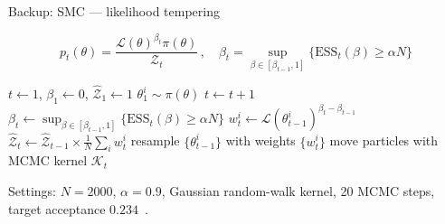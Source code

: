 \documentclass[usenames,dvipsnames,t]{beamer}
\begin{document}


\begin{frame}{Backup: SMC --- likelihood tempering}
  \def\x{1mm}


  \small
  \begin{equation*}
    p_t(\theta) = \frac{\mathcal{L}(\theta)^{\beta_t}\pi(\theta)}{\mathcal{Z}_t} \, , \quad \beta_t = \sup_{\beta \in [\beta_{t-1},1]}\{\mathrm{ESS}_t(\beta) \geq \alpha N\}
  \end{equation*}
  \normalsize

  \vspace{3mm}

  \scriptsize
  \begin{algorithmic}[1]
    \State $t \gets 1$, $\beta_1 \gets 0$, $\hat{\mathcal{Z}}_1 \gets 1$
      \State $\theta_1^i \sim \pi(\theta)$ 
    \EndFor
      \State $t \gets t+1$
      \State $\beta_t \gets \sup_{\beta \in [\beta_{t-1},1]}\{\mathrm{ESS}_t(\beta) \geq \alpha N\}$ 
        \State $w_t^i \gets \mathcal{L}(\theta_{t-1}^i)^{\beta_t - \beta_{t-1}}$ 
      \EndFor
      \State $\hat{\mathcal{Z}}_t \gets \hat{\mathcal{Z}}_{t-1} \times \tfrac1N \sum_i w_t^i$ 
      \State resample $\{\theta_{t-1}^i\}$ with weights $\{w_t^i\}$
      \State move particles with MCMC kernel $\mathcal{K}_t$ 
    \EndWhile
  \end{algorithmic}
  \normalsize

  \vspace{-1mm}
  \scriptsize Settings: $N=2000$, $\alpha=0.9$, Gaussian random-walk kernel, 20 MCMC steps, target acceptance $0.234$~. \normalsize

\end{frame}
\end{document}
